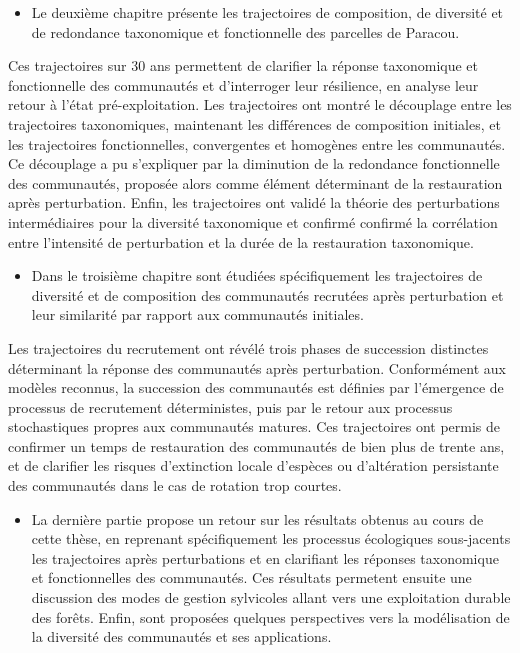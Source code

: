 \documentclass[
  11pt,
  french,
  A4paper,
  extrafontsizes,onecolumn,openright
  ]{memoir}
\providecommand{\tightlist}{%
  \setlength{\itemsep}{0pt}\setlength{\parskip}{0pt}}
\begin{document}
\begin{itemize}
\tightlist
\item
  Le deuxième chapitre présente les trajectoires de composition, de
  diversité et de redondance taxonomique et fonctionnelle des parcelles
  de Paracou.
\end{itemize}

Ces trajectoires sur 30 ans permettent de clarifier la réponse
taxonomique et fonctionnelle des communautés et d'interroger leur
résilience, en analyse leur retour à l'état pré-exploitation. Les
trajectoires ont montré le découplage entre les trajectoires
taxonomiques, maintenant les différences de composition initiales, et
les trajectoires fonctionnelles, convergentes et homogènes entre les
communautés. Ce découplage a pu s'expliquer par la diminution de la
redondance fonctionnelle des communautés, proposée alors comme élément
déterminant de la restauration après perturbation. Enfin, les
trajectoires ont validé la théorie des perturbations intermédiaires pour
la diversité taxonomique et confirmé confirmé la corrélation entre
l'intensité de perturbation et la durée de la restauration taxonomique.

\begin{itemize}
\tightlist
\item
  Dans le troisième chapitre sont étudiées spécifiquement les
  trajectoires de diversité et de composition des communautés recrutées
  après perturbation et leur similarité par rapport aux communautés
  initiales.
\end{itemize}

Les trajectoires du recrutement ont révélé trois phases de succession
distinctes déterminant la réponse des communautés après perturbation.
Conformément aux modèles reconnus, la succession des communautés est
définies par l'émergence de processus de recrutement déterministes, puis
par le retour aux processus stochastiques propres aux communautés
matures. Ces trajectoires ont permis de confirmer un temps de
restauration des communautés de bien plus de trente ans, et de clarifier
les risques d'extinction locale d'espèces ou d'altération persistante
des communautés dans le cas de rotation trop courtes.

\begin{itemize}
\tightlist
\item
  La dernière partie propose un retour sur les résultats obtenus au
  cours de cette thèse, en reprenant spécifiquement les processus
  écologiques sous-jacents les trajectoires après perturbations et en
  clarifiant les réponses taxonomique et fonctionnelles des communautés.
  Ces résultats permetent ensuite une discussion des modes de gestion
  sylvicoles allant vers une exploitation durable des forêts. Enfin,
  sont proposées quelques perspectives vers la modélisation de la
  diversité des communautés et ses applications.
\end{itemize}
\end{document}
